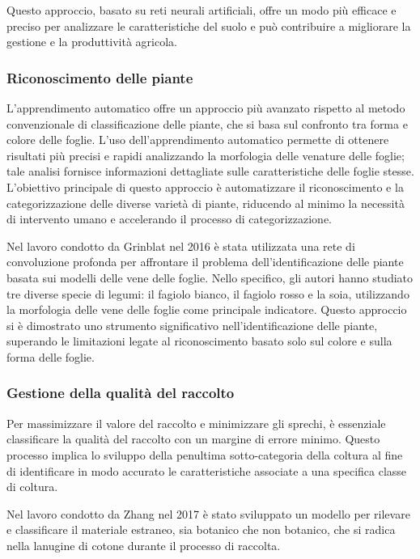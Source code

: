Questo approccio, basato su reti neurali artificiali, offre un modo più efficace e preciso per analizzare le caratteristiche del suolo e può contribuire a migliorare la gestione e la produttività agricola.

\subsubsection{Riconoscimento delle piante}

L'apprendimento automatico offre un approccio più avanzato rispetto al metodo convenzionale di classificazione delle piante, che si basa sul confronto tra forma e colore delle foglie. L'uso dell'apprendimento automatico permette di ottenere risultati più precisi e rapidi analizzando la morfologia delle venature delle foglie; tale analisi fornisce informazioni dettagliate sulle caratteristiche delle foglie stesse. L'obiettivo principale di questo approccio è automatizzare il riconoscimento e la categorizzazione delle diverse varietà di piante, riducendo al minimo la necessità di intervento umano e accelerando il processo di categorizzazione.

Nel lavoro condotto da Grinblat nel 2016 è stata utilizzata una rete di convoluzione profonda per affrontare il problema dell'identificazione delle piante basata sui modelli delle vene delle foglie. Nello specifico, gli autori hanno studiato tre diverse specie di legumi: il fagiolo bianco, il fagiolo rosso e la soia, utilizzando la morfologia delle vene delle foglie come principale indicatore. Questo approccio si è dimostrato uno strumento significativo nell'identificazione delle piante, superando le limitazioni legate al riconoscimento basato solo sul colore e sulla forma delle foglie.

\subsubsection{Gestione della qualità del raccolto}

Per massimizzare il valore del raccolto e minimizzare gli sprechi, è essenziale classificare la qualità del raccolto con un margine di errore minimo. Questo processo implica lo sviluppo della penultima sotto-categoria della coltura al fine di identificare in modo accurato le caratteristiche associate a una specifica classe di coltura.

Nel lavoro condotto da Zhang nel 2017 è stato sviluppato un modello per rilevare e classificare il materiale estraneo, sia botanico che non botanico, che si radica nella lanugine di cotone durante il processo di raccolta.

